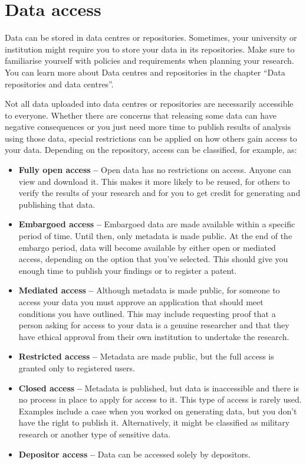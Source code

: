 \documentclass[
]{book}
\begin{document}
\hypertarget{data-access}{%
\section{Data access}\label{data-access}}

Data can be stored in data centres or repositories. Sometimes, your university or institution might require you to store your data in its repositories. Make sure to familiarise yourself with policies and requirements when planning your research. You can learn more about Data centres and repositories in the chapter ``Data repositories and data centres''.

Not all data uploaded into data centres or repositories are necessarily accessible to everyone. Whether there are concerns that releasing some data can have negative consequences or you just need more time to publish results of analysis using those data, special restrictions can be applied on how others gain access to your data. Depending on the repository, access can be classified, for example, as:

\begin{itemize}
\item
  \textbf{Fully open access} \textbf{--} Open data has no restrictions on access. Anyone can view and download it. This makes it more likely to be reused, for others to verify the results of your research and for you to get credit for generating and publishing that data.
\item
  \textbf{Embargoed access} \textbf{--} Embargoed data are made available within a specific period of time. Until then, only metadata is made public. At the end of the embargo period, data will become available by either open or mediated access, depending on the option that you've selected. This should give you enough time to publish your findings or to register a patent.
\item
  \textbf{Mediated access} \textbf{--} Although metadata is made public, for someone to access your data you must approve an application that should meet conditions you have outlined. This may include requesting proof that a person asking for access to your data is a genuine researcher and that they have ethical approval from their own institution to undertake the research.
\item
  \textbf{Restricted access} \textbf{--} Metadata are made public, but the full access is granted only to registered users.
\item
  \textbf{Closed access} \textbf{--} Metadata is published, but data is inaccessible and there is no process in place to apply for access to it. This type of access is rarely used. Examples include a case when you worked on generating data, but you don't have the right to publish it. Alternatively, it might be classified as military research or another type of sensitive data.
\item
  \textbf{Depositor access} \textbf{--} Data can be accessed solely by depositors.
\end{itemize}
\end{document}
